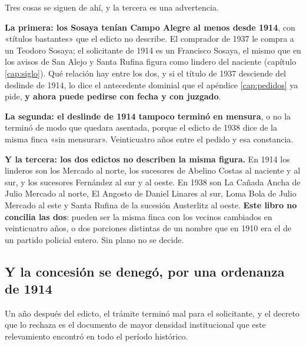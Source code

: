 Tres cosas se siguen de ahí, y la tercera es una advertencia.

\textbf{La primera: los Sosaya tenían Campo Alegre al menos desde 1914}, con «títulos
bastantes» que el edicto no describe. El comprador de 1937 le compra a un Teodoro Sosaya; el
solicitante de 1914 es un Francisco Sosaya, el mismo que en los avisos de San Alejo y Santa
Rufina figura como lindero del naciente (capítulo \ref{cap:siglo}). Qué relación hay entre los
dos, y si el título de 1937 desciende del deslinde de 1914, lo dice el antecedente dominial que
el apéndice \ref{cap:pedidos} ya pide, \textbf{y ahora puede pedirse con fecha y con juzgado}.

\textbf{La segunda: el deslinde de 1914 tampoco terminó en mensura}, o no la terminó de modo
que quedara asentada, porque el edicto de 1938 dice de la misma finca «sin mensurar».
Veinticuatro años entre el pedido y esa constancia.

\textbf{Y la tercera: los dos edictos no describen la misma figura.} En 1914 los linderos son
los Mercado al norte, los sucesores de Abelino Costas al naciente y al sur, y los sucesores
Fernández al sur y al oeste. En 1938 son La Cañada Ancha de Julio Mercado al norte, El Angosto
de Daniel Linares al sur, Loma Bola de Julio Mercado al este y Santa
Rufina de la sucesión Austerlitz al oeste. \textbf{Este libro no
concilia las dos}: pueden ser la misma finca con los vecinos cambiados en veinticuatro años, o
dos porciones distintas de un nombre que en 1910 era el de un partido policial entero. Sin
plano no se decide.

\subsection*{Y la concesión se denegó, por una ordenanza de 1914}

Un año después del edicto, el trámite terminó mal para el solicitante, y el decreto que lo
rechaza es el documento de mayor densidad institucional que este relevamiento encontró en
todo el período histórico.

